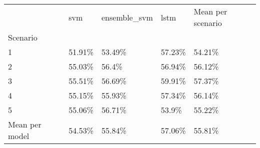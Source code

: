 \begin{tabular}{lllll}
\toprule
 & svm & ensemble_svm & lstm & Mean per scenario \\
Scenario &  &  &  &  \\
\midrule
1 & 51.91\% & 53.49\% & 57.23\% & 54.21\% \\
2 & 55.03\% & 56.4\% & 56.94\% & 56.12\% \\
3 & 55.51\% & 56.69\% & 59.91\% & 57.37\% \\
4 & 55.15\% & 55.93\% & 57.34\% & 56.14\% \\
5 & 55.06\% & 56.71\% & 53.9\% & 55.22\% \\
Mean per model & 54.53\% & 55.84\% & 57.06\% & 55.81\% \\
\bottomrule
\end{tabular}
